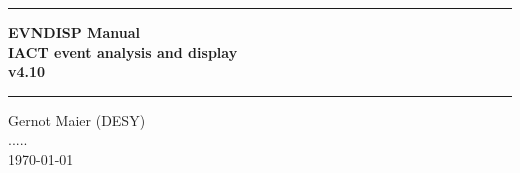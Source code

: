 
\newcommand{\HRule}{\rule{\linewidth}{1mm}}

\begin{titlepage}
\thispagestyle{empty}
\setlength{\parindent}{0mm}
\setlength{\parskip}{0mm}

\vspace*{10mm}
\HRule
\begin{flushright}
 \Huge \bf
  EVNDISP Manual \\
    IACT event analysis and display \\
     v4.10
\end{flushright}
\HRule
\vspace{10mm}
\begin{center}
   \Large
   
   \vspace{3.5cm}
  
   \vspace{0.5cm}
    
   \vspace{0.5cm}
   Gernot Maier (DESY) \\
   .....\\
   \today \\

   \vspace{6.3cm}

\end{center}
\begin{flushleft}
\Large

\end{flushleft}

%

\end{titlepage}
